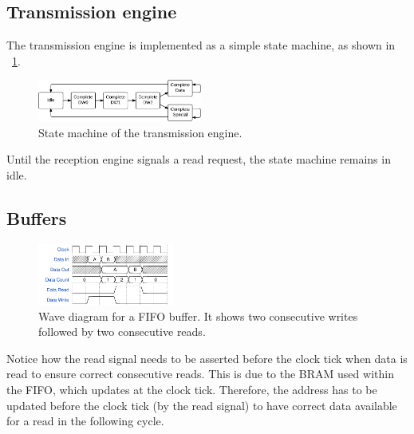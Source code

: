 
\subsection{Transmission engine}

The transmission engine is implemented as a simple state machine, as shown in \figurename~\ref{fig:statemachine-transmit}.

\begin{figure}[!ht]
    \centering
    \includegraphics[width=0.48\textwidth]{figures/statemachine-transmit}
    \caption{State machine of the transmission engine.}
    \label{fig:statemachine-transmit}
\end{figure}

Until the reception engine signals a read request, the state machine remains in idle.


\subsection{Buffers}


\begin{figure}[!ht]
    \centering
    \includegraphics[width=0.40\textwidth]{figures/wavediagram-fifo}
    \caption{Wave diagram for a FIFO buffer. It shows two consecutive writes followed by two consecutive reads.}
    \label{fig:wavediagram-fifo}
\end{figure}

Notice how the read signal needs to be asserted before the clock tick when data is read to ensure correct consecutive reads.
This is due to the BRAM used within the FIFO, which updates at the clock tick.
Therefore, the address has to be updated before the clock tick (by the read signal) to have correct data available for a read in the following cycle.


